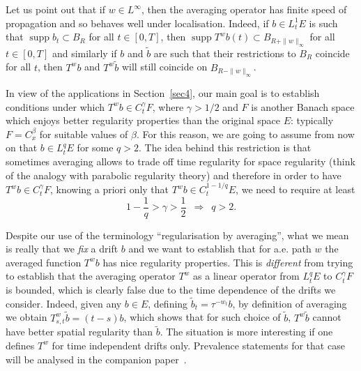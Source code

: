 \documentclass[10pt]{article}
\newcommand{\tmop}[1]{\ensuremath{\operatorname{#1}}}
\newcommand{\tmtextit}[1]{{\itshape{#1}}}
\begin{document}
\begin{remark}
  \label{sec3.1 remark localization}Let us point out that if $w \in
  L^{\infty}$, then the averaging operator has finite speed of propagation and
  so behaves well under localisation. Indeed, if $b \in L^1_t E$ is such that
  $\tmop{supp} b_t \subset B_R$ for all $t \in [0, T]$, then $\tmop{supp} T^w
  b (t) \subset B_{R + \| w \|_{\infty}}$ for all $t \in [0, T]$ and similarly
  if $b$ and $\tilde{b}$ are such that their restrictions to $B_R$ coincide
  for all $t$, then $T^w b$ and $T^w \tilde{b}$ will still coincide on $B_{R -
  \| w \|_{\infty}}$.
\end{remark}

In view of the applications in Section~\ref{sec4}, our main goal is to
establish conditions under which $T^w b \in C^{\gamma}_t F$, where $\gamma > 1
/ 2$ and $F$ is another Banach space which enjoys better regularity properties
than the original space $E$: typically $F = C^{\beta}_x$ for suitable values
of $\beta$. For this reason, we are going to assume from now on that $b \in
L^q_t E$ for some $q > 2$. The idea behind this restriction is that sometimes
averaging allows to trade off time regularity for space regularity (think of
the analogy with parabolic regularity theory) and therefore in order to have
$T^w b \in C^{\gamma}_t F$, knowing a priori only that $T^w b \in C^{1 - 1 /
q}_t E$, we need to require at least
\[ 1 - \frac{1}{q} > \gamma > \frac{1}{2}  \enspace \Rightarrow \enspace q >
   2. \]
\begin{remark}
  \label{sec3.1 remark limitation}Despite our use of the terminology
  ``regularisation by averaging'', what we mean is really that we
  \tmtextit{fix} a drift $b$ and we want to establish that for a.e. path $w$
  the averaged function $T^w b$ has nice regularity properties. This is
  \tmtextit{different} from trying to establish that the averaging operator
  $T^w$ as a linear operator from $L^q_t E$ to $C^{\gamma}_t F$ is bounded,
  which is clearly false due to the time dependence of the drifts we consider.
  Indeed, given any $b \in E$, defining $\tilde{b}_t = \tau^{- w_t} b$, by
  definition of averaging we obtain $T_{s, t}^w \tilde{b} = (t - s) b$, which
  shows that for such choice of $\tilde{b}$, $T^w \tilde{b}$ cannot have
  better spatial regularity than $\tilde{b}$. The situation is more
  interesting if one defines $T^w$ for time independent drifts only.
  Prevalence statements for that case will be analysed in the companion
  paper~{\cite{galeatigubinelli}}.
\end{remark}
\end{document}
